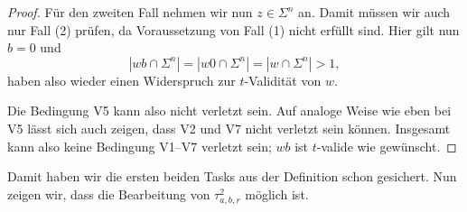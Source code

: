 \begin{proof}
    Für den zweiten Fall nehmen wir nun $z\in\Sigma^n$ an.
    Damit müssen wir auch nur Fall (2) prüfen, da Voraussetzung von Fall (1) nicht erfüllt sind.
    Hier gilt nun $b=0$ und
    \[ |wb\cap\Sigma^n|=|w0\cap\Sigma^n|=|w\cap\Sigma^n|>1, \]
    haben also wieder einen Widerspruch zur $t$-Validität von $w$.

    Die Bedingung V5 kann also nicht verletzt sein.
    Auf analoge Weise wie eben bei V5 lässt sich auch zeigen, dass V2 und V7 nicht verletzt sein können.
    Insgesamt kann also keine Bedingung V1--V7 verletzt sein; $wb$ ist $t$-valide wie gewünscht.
\end{proof}

Damit haben wir die ersten beiden Tasks aus der Definition schon gesichert. Nun zeigen wir, dass die Bearbeitung von $\tau^2_{a,b,r}$ möglich ist.

